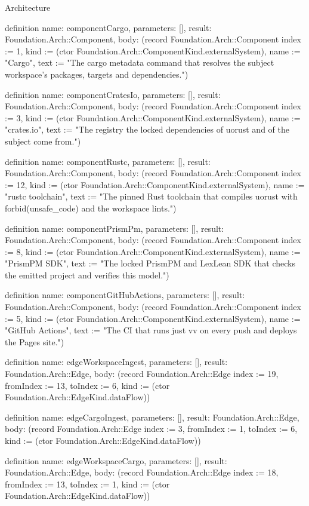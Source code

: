 \begin{lexlean}{Architecture}
\begin{semanticmodule}
definition{
  name: componentCargo,
  parameters: [],
  result: Foundation.Arch::Component,
  body: (record Foundation.Arch::Component {index := 1, kind := (ctor Foundation.Arch::ComponentKind.externalSystem), name := "Cargo", text := "The cargo metadata command that resolves the subject workspace's packages, targets and dependencies."})
}

definition{
  name: componentCratesIo,
  parameters: [],
  result: Foundation.Arch::Component,
  body: (record Foundation.Arch::Component {index := 3, kind := (ctor Foundation.Arch::ComponentKind.externalSystem), name := "crates.io", text := "The registry the locked dependencies of uorust and of the subject come from."})
}

definition{
  name: componentRustc,
  parameters: [],
  result: Foundation.Arch::Component,
  body: (record Foundation.Arch::Component {index := 12, kind := (ctor Foundation.Arch::ComponentKind.externalSystem), name := "rustc toolchain", text := "The pinned Rust toolchain that compiles uorust with forbid(unsafe_code) and the workspace lints."})
}

definition{
  name: componentPrismPm,
  parameters: [],
  result: Foundation.Arch::Component,
  body: (record Foundation.Arch::Component {index := 8, kind := (ctor Foundation.Arch::ComponentKind.externalSystem), name := "PrismPM SDK", text := "The locked PrismPM and LexLean SDK that checks the emitted project and verifies this model."})
}

definition{
  name: componentGitHubActions,
  parameters: [],
  result: Foundation.Arch::Component,
  body: (record Foundation.Arch::Component {index := 5, kind := (ctor Foundation.Arch::ComponentKind.externalSystem), name := "GitHub Actions", text := "The CI that runs just vv on every push and deploys the Pages site."})
}

definition{
  name: edgeWorkspaceIngest,
  parameters: [],
  result: Foundation.Arch::Edge,
  body: (record Foundation.Arch::Edge {index := 19, fromIndex := 13, toIndex := 6, kind := (ctor Foundation.Arch::EdgeKind.dataFlow)})
}

definition{
  name: edgeCargoIngest,
  parameters: [],
  result: Foundation.Arch::Edge,
  body: (record Foundation.Arch::Edge {index := 3, fromIndex := 1, toIndex := 6, kind := (ctor Foundation.Arch::EdgeKind.dataFlow)})
}

definition{
  name: edgeWorkspaceCargo,
  parameters: [],
  result: Foundation.Arch::Edge,
  body: (record Foundation.Arch::Edge {index := 18, fromIndex := 13, toIndex := 1, kind := (ctor Foundation.Arch::EdgeKind.dataFlow)})
}


\end{semanticmodule}
\end{lexlean}
